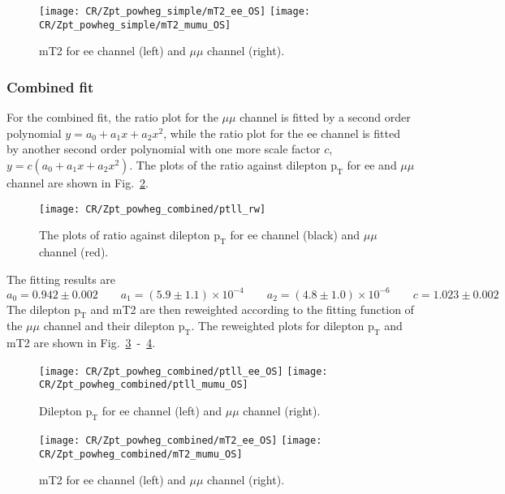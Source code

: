 \begin{figure}
\texttt{[image: CR/Zpt\_powheg\_simple/mT2\_ee\_OS]}
\texttt{[image: CR/Zpt\_powheg\_simple/mT2\_mumu\_OS]}
\caption{mT2 for ee channel (left) and $\mu\mu$ channel (right).}
\label{zpt_powheg_simple_end}
\end{figure}

\subsubsection{Combined fit}
For the combined fit, the ratio plot for the $\mu\mu$ channel is fitted by a second order polynomial $y = a_0 + a_1 x + a_2 x^2$, while the ratio plot for the ee channel is fitted by another second order polynomial with one more scale factor $c$, $y = c(a_0 + a_1 x + a_2 x^2)$.
The plots of the ratio against dilepton $\text{p}_{\text{T}}$ for ee and $\mu\mu$ channel are shown in Fig.~\ref{zpt_powheg_combined}.
\begin{figure}
\centering
\texttt{[image: CR/Zpt\_powheg\_combined/ptll\_rw]}
\caption{The plots of ratio against dilepton $\text{p}_{\text{T}}$ for ee channel (black) and $\mu\mu$ channel (red).}
\label{zpt_powheg_combined}
\end{figure}
The fitting results are
\begin{equation}
a_0 = 0.942 \pm 0.002 \qquad
a_1 = (5.9 \pm 1.1) \times 10^{-4} \qquad
a_2 = (4.8 \pm 1.0) \times 10^{-6} \qquad
c =  1.023 \pm 0.002
\end{equation}
The dilepton $\text{p}_{\text{T}}$ and mT2 are then reweighted according to the fitting function of the $\mu\mu$ channel and their dilepton $\text{p}_{\text{T}}$.
The reweighted plots for dilepton $\text{p}_{\text{T}}$ and mT2 are shown in Fig.~\ref{zpt_powheg_combined_start}~-~\ref{zpt_powheg_combined_end}.

\begin{figure}
\texttt{[image: CR/Zpt\_powheg\_combined/ptll\_ee\_OS]}
\texttt{[image: CR/Zpt\_powheg\_combined/ptll\_mumu\_OS]}
\caption{Dilepton $\text{p}_{\text{T}}$ for ee channel (left) and $\mu\mu$ channel (right).}
\label{zpt_powheg_combined_start}
\end{figure}

\begin{figure}
\texttt{[image: CR/Zpt\_powheg\_combined/mT2\_ee\_OS]}
\texttt{[image: CR/Zpt\_powheg\_combined/mT2\_mumu\_OS]}
\caption{mT2 for ee channel (left) and $\mu\mu$ channel (right).}
\label{zpt_powheg_combined_end}
\end{figure}
